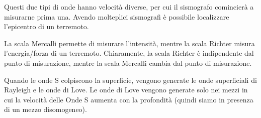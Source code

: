 \documentclass[preview]{standalone}
\begin{document}
\begin{plainhtml}
    Questi due tipi di onde hanno velocità diverse, per cui il sismografo comincierà a misurarne
    prima una. Avendo molteplici sismografi è possibile localizzare l'epicentro di un terremoto.
\end{plainhtml}

\begin{plainhtml}
    La scala Mercalli permette di misurare l'intensità, mentre la scala Richter misura l'energia/forza di un terremoto.
    Chiaramente, la scala Richter è indipendente dal punto di misurazione, mentre la scala Mercalli cambia dal punto di misurazione.
\end{plainhtml}


\begin{plainhtml}
    Quando le onde S colpiscono la superficie, vengono generate
    le onde superficiali di Rayleigh e le onde di Love. Le onde di Love
    vengono generate solo nei mezzi in cui la velocità delle
    Onde S aumenta con la profondità (quindi siamo in presenza di un mezzo disomogeneo).
\end{plainhtml}
\end{document}

